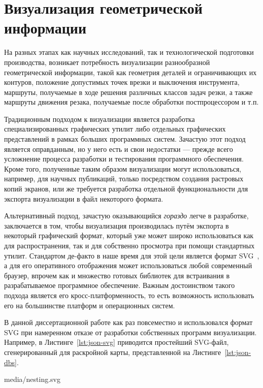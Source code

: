 
\section{
  Визуализация геометрической информации
}
\label{sec:json.view}

На разных этапах
как научных исследований,
так и технологической подготовки производства,
возникает потребность визуализации разнообразной
геометрической информации,
такой как геометрия деталей
и ограничивающих их контуров,
положение допустимых точек врезки
и выключения инструмента,
маршруты,
получаемые в ходе
решения различных классов задач резки,
а также маршруты движения резака,
получаемые после обработки постпроцессором
и т.п.

Традиционным подходом к визуализации является
разработка специализированных графических утилит
либо отдельных графических представлений
в рамках больших программных систем.
Зачастую этот подход является оправданным,
но у него есть и свои недостатки ---
прежде всего усложнение процесса разработки
и тестирования программного обеспечения.
Кроме того,
полученные таким образом визуализации
могут использоваться,
например, для научных публикаций,
только посредством создания растровых копий экранов,
или же требуется разработка отдельной функциональности
для экспорта визуализации в файл некоторого формата.

Альтернативный подход,
зачастую оказывающийся
\textit{гораздо}
легче в разработке,
заключается в том,
чтобы визуализация производилась
путём экспорта в некоторый графический формат,
который уже может широко использоваться как
для распространения,
так и для собственно просмотра при помощи
стандартных утилит.
Стандартом де-факто в наше время
для этой цели является формат
SVG~\cite{bi:SVG},
а для его оперативного отображения
может использоваться любой современный браузер,
впрочем как и множество готовых библиотек
для встраивания в разрабатываемое программное обеспечение.
Важным достоинством такого подхода
является его кросс-платформенность,
то есть возможность использовать его
на большинстве платформ и операционных систем.

В данной диссертационной работе
как раз повсеместно и использовался формат SVG
при намеренном отказе от разработки
собственных программ визуализации.
Например,
в Листинге~\ref{lst:json-svg}
приводится простейший SVG-файл,
сгенерированный для раскройной карты,
представленной на Листинге~\ref{lst:json-dbs}.


  {media/nesting.svg}


